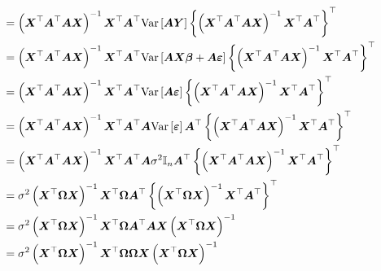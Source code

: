 \begin{questions}
\begin{solution}
\begin{parts}
\begin{subparts}
\begin{align*}
                &= \left(\boldsymbol{X}^{\top}\boldsymbol{A} ^\top\boldsymbol{A} \boldsymbol{X}\right)^{-1}  \boldsymbol{X}^{\top}\boldsymbol{A}^\top \mathrm{Var}\left[\boldsymbol{A} \boldsymbol{Y}\right] \left\{ \left(\boldsymbol{X}^{\top}\boldsymbol{A} ^\top\boldsymbol{A} \boldsymbol{X}\right)^{-1}  \boldsymbol{X}^{\top}\boldsymbol{A}^\top \right\}^\top\cr
                &= \left(\boldsymbol{X}^{\top}\boldsymbol{A} ^\top\boldsymbol{A} \boldsymbol{X}\right)^{-1}  \boldsymbol{X}^{\top}\boldsymbol{A}^\top \mathrm{Var}\left[\boldsymbol{A} \boldsymbol{X}\boldsymbol{\beta} + \boldsymbol{A} \boldsymbol{\varepsilon}\right] \left\{ \left(\boldsymbol{X}^{\top}\boldsymbol{A} ^\top\boldsymbol{A} \boldsymbol{X}\right)^{-1}  \boldsymbol{X}^{\top}\boldsymbol{A}^\top \right\}^\top\cr
                &= \left(\boldsymbol{X}^{\top}\boldsymbol{A} ^\top\boldsymbol{A} \boldsymbol{X}\right)^{-1}  \boldsymbol{X}^{\top}\boldsymbol{A}^\top \mathrm{Var}\left[\boldsymbol{A} \boldsymbol{\varepsilon}\right] \left\{ \left(\boldsymbol{X}^{\top}\boldsymbol{A} ^\top\boldsymbol{A} \boldsymbol{X}\right)^{-1}  \boldsymbol{X}^{\top}\boldsymbol{A}^\top \right\}^\top\cr
                &= \left(\boldsymbol{X}^{\top}\boldsymbol{A} ^\top\boldsymbol{A} \boldsymbol{X}\right)^{-1}  \boldsymbol{X}^{\top}\boldsymbol{A}^\top \boldsymbol{A}\mathrm{Var}\left[ \boldsymbol{\varepsilon}\right] \boldsymbol{A}^\top\left\{ \left(\boldsymbol{X}^{\top}\boldsymbol{A} ^\top\boldsymbol{A} \boldsymbol{X}\right)^{-1}  \boldsymbol{X}^{\top}\boldsymbol{A}^\top \right\}^\top\cr
                &= \left(\boldsymbol{X}^{\top}\boldsymbol{A} ^\top\boldsymbol{A} \boldsymbol{X}\right)^{-1}  \boldsymbol{X}^{\top}\boldsymbol{A}^\top \boldsymbol{A}\sigma^2 \mathbb{I}_n\boldsymbol{A}^\top\left\{ \left(\boldsymbol{X}^{\top}\boldsymbol{A} ^\top\boldsymbol{A} \boldsymbol{X}\right)^{-1}  \boldsymbol{X}^{\top}\boldsymbol{A}^\top \right\}^\top\cr
                &= 
                \sigma^2 \left(\boldsymbol{X}^{\top}\boldsymbol{\Omega} \boldsymbol{X}\right)^{-1}  \boldsymbol{X}^{\top}\boldsymbol{\Omega}\boldsymbol{A}^\top\left\{ \left(\boldsymbol{X}^{\top}\boldsymbol{\Omega} \boldsymbol{X}\right)^{-1}  \boldsymbol{X}^{\top}\boldsymbol{A}^\top \right\}^\top \cr
                &= 
                \sigma^2 \left(\boldsymbol{X}^{\top}\boldsymbol{\Omega} \boldsymbol{X}\right)^{-1}  \boldsymbol{X}^{\top}\boldsymbol{\Omega}\boldsymbol{A}^\top \boldsymbol{A} \boldsymbol{X} \left(\boldsymbol{X}^{\top}\boldsymbol{\Omega} \boldsymbol{X}\right)^{-1}  \cr
                &= 
                \sigma^2 \left(\boldsymbol{X}^{\top}\boldsymbol{\Omega} \boldsymbol{X}\right)^{-1}  \boldsymbol{X}^{\top}\boldsymbol{\Omega}\boldsymbol{\Omega} \boldsymbol{X} \left(\boldsymbol{X}^{\top}\boldsymbol{\Omega} \boldsymbol{X}\right)^{-1}  \cr

\end{align*}
\end{subparts}
\end{parts}
\end{solution}
\end{questions}
